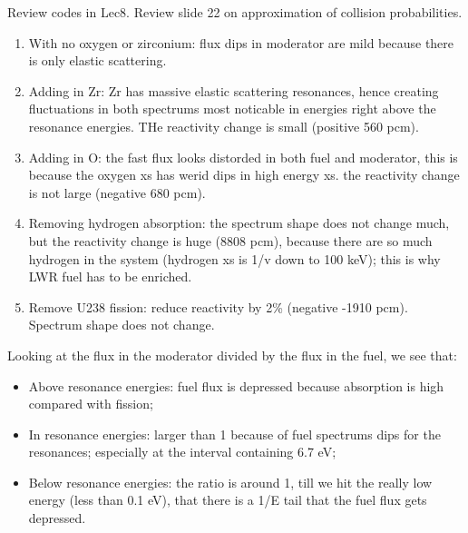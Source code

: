 \documentclass{school-22.211-notes}
\date{March  7, 2012}
\begin{document}
\maketitle


Review codes in Lec8. Review slide 22 on approximation of collision probabilities. 

\begin{enumerate}
\item With no oxygen or zirconium: flux dips in moderator are mild because there is only elastic scattering. 
\item Adding in Zr: Zr has massive elastic scattering resonances, hence creating fluctuations in both spectrums most noticable in energies right above the resonance energies. THe reactivity change is small (positive 560 pcm).
\item Adding in O: the fast flux looks distorded in both fuel and moderator, this is because the oxygen xs has werid dips in high energy xs. the reactivity change is not large (negative 680 pcm). 
\item Removing hydrogen absorption: the spectrum shape does not change much, but the reactivity change is huge (8808 pcm), because there are so much hydrogen in the system (hydrogen xs is 1/v down to 100 keV); this is why LWR fuel has to be enriched. 
\item Remove U238 fission: reduce reactivity by 2\% (negative -1910 pcm). Spectrum shape does not change. 
\end{enumerate}
Looking at the flux in the moderator divided by the flux in the fuel, we see that:
\begin{itemize}
\item Above resonance energies: fuel flux is depressed because absorption is high compared with fission; 
\item In resonance energies: larger than 1 because of fuel spectrums dips for the resonances; especially at the interval containing 6.7 eV;
\item Below resonance energies: the ratio is around 1, till we hit the really low energy (less than 0.1 eV), that there is a 1/E tail that the fuel flux gets depressed. 
\end{itemize}
\end{document}

